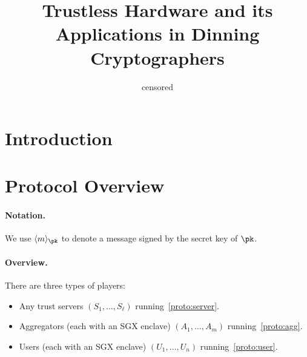 \documentclass[usenames,dvipsnames]{article}
\title{Trustless Hardware and its Applications in Dinning Cryptographers}
\author{censored}
\begin{document}
\maketitle

\section{Introduction}

\section{Protocol Overview}

\paragraph{Notation.} We use $\signed{m}{\pk}$ to denote a message signed by the secret key of $\pk$.

\paragraph{Overview.}

There are three types of players:

\begin{itemize}
    \item Any trust servers $(S_1, \dots, S_\ell)$ running~\cref{proto:server}.
    \item Aggregators (each with an SGX enclave) $(A_1, \dots, A_m)$ running~\cref{proto:agg}.
    \item Users (each with an SGX enclave) $(U_1, \dots, U_n)$ running~\cref{proto:user}.
\end{itemize}
\end{document}
